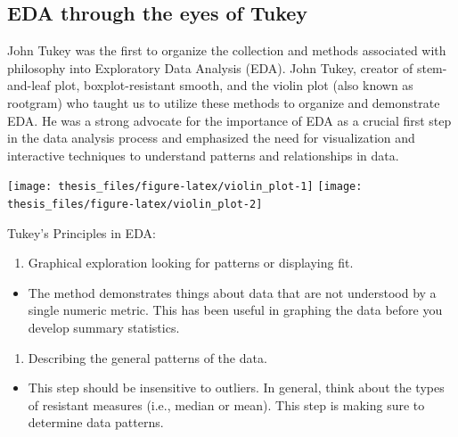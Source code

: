 \documentclass[print]{nuthesis}
\providecommand{\tightlist}{%
  \setlength{\itemsep}{0pt}\setlength{\parskip}{0pt}}
\begin{document}
\hypertarget{eda-through-the-eyes-of-tukey}{%
\subsection{EDA through the eyes of Tukey}\label{eda-through-the-eyes-of-tukey}}

John Tukey was the first to organize the collection and methods associated with philosophy into Exploratory Data Analysis (EDA). John Tukey, creator of stem-and-leaf plot, boxplot-resistant smooth, and the violin plot (also known as rootgram) who taught us to utilize these methods to organize and demonstrate EDA. He was a strong advocate for the importance of EDA as a crucial first step in the data analysis process and emphasized the need for visualization and interactive techniques to understand patterns and relationships in data.

\begin{center}\texttt{[image: thesis\_files/figure-latex/violin\_plot-1]} \texttt{[image: thesis\_files/figure-latex/violin\_plot-2]} \end{center}

Tukey's Principles in EDA:

\begin{enumerate}
\def\labelenumi{\arabic{enumi}.}
\tightlist
\item
  Graphical exploration looking for patterns or displaying fit.
\end{enumerate}

\begin{itemize}
\tightlist
\item
  The method demonstrates things about data that are not understood by a single numeric metric. This has been useful in graphing the data before you develop summary statistics.
\end{itemize}

\begin{enumerate}
\def\labelenumi{\arabic{enumi}.}
\setcounter{enumi}{1}
\tightlist
\item
  Describing the general patterns of the data.
\end{enumerate}

\begin{itemize}
\tightlist
\item
  This step should be insensitive to outliers. In general, think about the types of resistant measures (i.e., median or mean). This step is making sure to determine data patterns.
\end{itemize}
\end{document}
